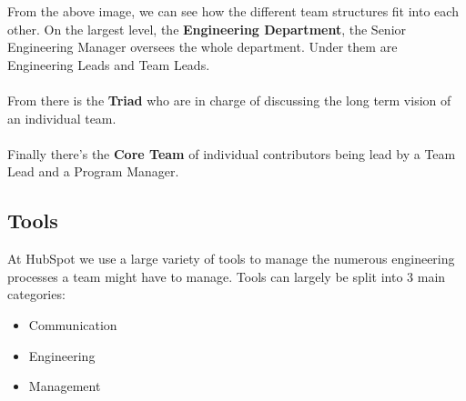 \documentclass[11pt]{article} %
\begin{document}
From the above image, we can see how the different team structures fit into each other. On the largest level, the \textbf{Engineering Department}, the Senior Engineering Manager oversees the whole department. Under them are Engineering Leads and Team Leads. 
\\\\
From there is the \textbf{Triad} who are in charge of discussing the long term vision of an individual team. 
\\\\
Finally there's the \textbf{Core Team} of individual contributors being lead by a Team Lead and a Program Manager.

\subsection{Tools}
At HubSpot we use a large variety of tools to manage the numerous engineering processes a team might have to manage. Tools can largely be split into 3 main categories: \begin{itemize} \item Communication \item Engineering \item Management \end{itemize}
\end{document}
